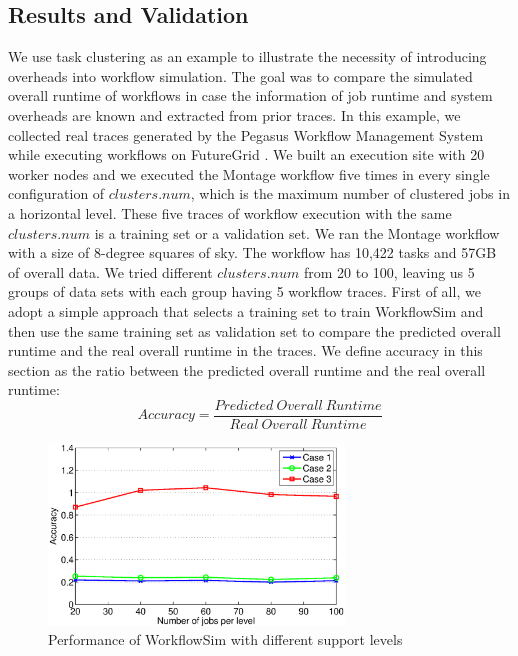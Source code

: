 \subsection{Results and Validation}
We use task clustering as an example to illustrate the necessity of introducing overheads into workflow simulation. The goal was to compare the simulated overall runtime of workflows in case the information of job runtime and system overheads are known and extracted from prior traces. 
In this example, we collected real traces generated by the Pegasus Workflow Management System while executing workflows on FutureGrid \cite{Fox2013FutureGrid}. We built an execution site with 20 worker nodes and we executed the Montage workflow five times in every single configuration of $clusters.num$, which is the maximum number of clustered jobs in a horizontal level. These five traces of workflow execution with the same $clusters.num$ is a training set or a validation set. 
We ran the Montage workflow with a size of 8-degree squares of sky. The workflow has 10,422 tasks and 57GB of overall data. We tried different $clusters.num$ from 20 to 100, leaving us 5 groups of data sets with each group having 5 workflow traces. 
First of all, we adopt a simple approach that selects a training set to train WorkflowSim and then use the same training set as validation set to compare the predicted overall runtime and the real overall runtime in the traces. We define accuracy in this section as the ratio between the predicted overall runtime and the real overall runtime:
\begin{equation} \label{eq:model_wfs_accuracy}
Accuracy=\frac{Predicted~Overall~Runtime}{Real~Overall~Runtime}
\end{equation}
 \begin{figure}[h!]
	\centering
    \includegraphics[width=0.7\textwidth]{figures/model/wfs_levels.eps}
    \caption{Performance of WorkflowSim with different support levels}
    \label{fig:model_wfs_levels}
\end{figure} 
 
